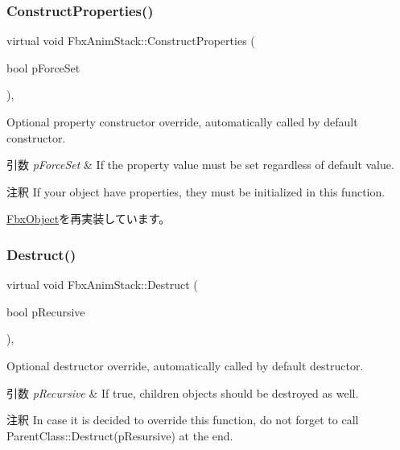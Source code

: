 \subsubsection{\texorpdfstring{Construct\+Properties()}{ConstructProperties()}}
{\footnotesize\ttfamily virtual void Fbx\+Anim\+Stack\+::\+Construct\+Properties (\begin{DoxyParamCaption}\item[{bool}]{p\+Force\+Set }\end{DoxyParamCaption})\hspace{0.3cm}{\ttfamily [protected]}, {\ttfamily [virtual]}}

Optional property constructor override, automatically called by default constructor. 
\begin{DoxyParams}{引数}
{\em p\+Force\+Set} & If the property value must be set regardless of default value. \\
\hline
\end{DoxyParams}
\begin{DoxyRemark}{注釈}
If your object have properties, they must be initialized in this function. 
\end{DoxyRemark}


\hyperlink{class_fbx_object_ad44f814323dc1b5e78bff1bfc608b4bb}{Fbx\+Object}を再実装しています。

\mbox{\label{class_fbx_anim_stack_a4809de086c3a2d28d98d771b011599d6}} 
\subsubsection{\texorpdfstring{Destruct()}{Destruct()}}
{\footnotesize\ttfamily virtual void Fbx\+Anim\+Stack\+::\+Destruct (\begin{DoxyParamCaption}\item[{bool}]{p\+Recursive }\end{DoxyParamCaption})\hspace{0.3cm}{\ttfamily [protected]}, {\ttfamily [virtual]}}

Optional destructor override, automatically called by default destructor. 
\begin{DoxyParams}{引数}
{\em p\+Recursive} & If true, children objects should be destroyed as well. \\
\hline
\end{DoxyParams}
\begin{DoxyRemark}{注釈}
In case it is decided to override this function, do not forget to call Parent\+Class\+::\+Destruct(p\+Resursive) at the end. 
\end{DoxyRemark}


